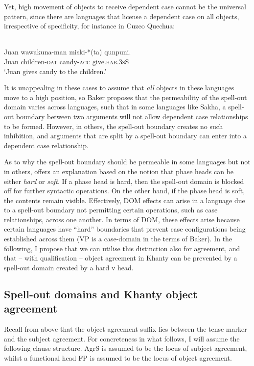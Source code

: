 \documentclass[output=paper
,modfonts
,nonflat]{langsci/langscibook}
\begin{document}
\noindent Yet, high movement of objects to receive dependent case cannot be the universal pattern, since there are languages that license a dependent case on all objects, irrespective of specificity, for instance in Cuzco Quechua:

\begin{exe}
\ex {}\\
\gll Juan wawakuna-man miski-*(ta) qunpuni.\\
Juan children-\textsc{dat} candy-\textsc{acc} give.\textsc{hab.3sS}\\
\glt `Juan gives candy to the children.'
\end{exe}
 
\noindent It is unappealing in these cases to assume that \emph{all} objects in these languages move to a high position, so Baker proposes that the permeability of the spell-out domain varies across languages, such that in some languages like Sakha, a spell-out boundary between two arguments will not allow dependent case relationships to be formed. 
However, in others, the spell-out boundary creates no such inhibition, and arguments that are split by a spell-out boundary can enter into a dependent case relationship. 

As to why the spell-out boundary should be permeable in some languages but not in others, \citeauthor{Baker2015} offers an explanation based on the notion that phase heads can be either \emph{hard} or \emph{soft}. 
If a phase head is hard, then the spell-out domain is blocked off for further syntactic operations. 
On the other hand, if the phase head is soft, the contents remain visible. 
Effectively, DOM effects can arise in a language due to a spell-out boundary not permitting certain operations, such as case relationships, across one another. 
In terms of DOM, these effects arise because certain languages have ``hard'' boundaries that prevent case configurations being established across them (VP is a case-domain in the terms of Baker).
In the following, I propose that we can utilise this distinction also for agreement, and that -- with qualification -- object agreement in Khanty can be prevented by a spell-out domain created by a hard v head.


\subsection{Spell-out domains and Khanty object agreement}

Recall from above that the object agreement suffix lies between the tense marker and the subject agreement. For concreteness in what follows, I will assume the following clause structure. AgrS is assumed to be the locus of subject agreement, whilst a functional head FP is assumed to be the locus of object agreement.
\end{document}
